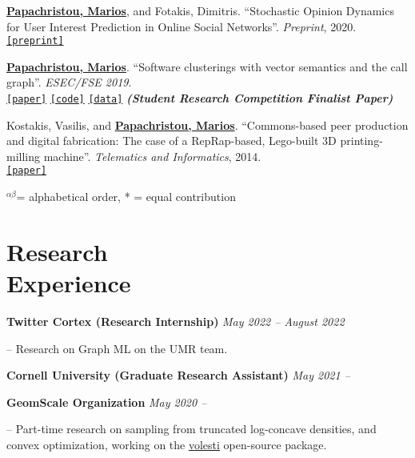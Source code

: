 \documentclass[margin]{res}
\newcommand{\alphabeticalorder}[0]{\ensuremath {^{\alpha \beta}}}
\newcommand{\specialurl}[2]{\href {#2} {\texttt{[#1]}}}
\newcommand{\preprint}[1]{\specialurl {preprint} {#1}}
\newcommand{\code}[1]{\specialurl {code} {#1}}
\newcommand{\data}[1]{\specialurl {data} {#1}}
\newcommand{\paper}[1]{\specialurl {paper} {#1}}
\newcommand{\authorref}[1]{\underline {\textbf{#1}}}
\newcommand{\authorme}{\authorref{Papachristou, Marios}}
\begin{document}
\begin{resume}
\begin{compactenum}
    \item \authorme, and Fotakis, Dimitris. ``Stochastic Opinion Dynamics for User Interest Prediction in Online Social Networks''.  \emph{Preprint}, 2020. \\ \preprint{https://www.researchgate.net/publication/353006940_Stochastic_Opinion_Dynamics_for_Interest_Prediction_in_Social_Networks}
    \item \authorme. ``Software clusterings with vector semantics and the call graph''. \emph{ESEC/FSE 2019}. \\ \paper{https://dl.acm.org/citation.cfm?id=3342483} \code{https://github.com/papachristoumarios/sade} \data{http://doi.org/10.5281/zenodo.2652487} \textbf{\emph{(Student Research Competition Finalist Paper)}}
    \item Kostakis, Vasilis, and \authorme. ``Commons-based peer production and digital fabrication: The case of a RepRap-based, Lego-built 3D printing-milling machine''. \emph{Telematics and Informatics}, 2014. \\ \paper{https://bit.ly/2JRoisV} 
    
\end{compactenum}

{
\footnotesize
\alphabeticalorder  = alphabetical order, * = equal contribution
}

\section{Research \\ Experience}

\textbf{Twitter Cortex (Research Internship)} \hfill \emph{May 2022 -- August 2022}
\begin{compactitem}
\item[--] Research on Graph ML on the UMR team. 
\end{compactitem}

\textbf{Cornell University (Graduate Research Assistant)} \hfill \emph{May 2021 --}

\textbf{GeomScale Organization} \hfill \emph{May 2020 --}

\begin{compactitem}
	\item[--] Part-time research on sampling from truncated log-concave densities, and convex optimization, working on the \href{https://github.com/GeomScale/volesti}{volesti} open-source package.
\end{compactitem}




\end{resume}
\end{document}
